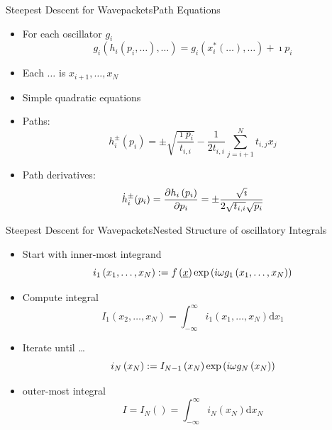 \documentclass{beamer}
\begin{document}
\begin{frame}{Steepest Descent for Wavepackets}{Path Equations}
  \begin{itemize}
    \item For each oscillator $g_i$
    \begin{equation*}
      g_i\left(h_i\left(p_i,\ldots\right), \ldots\right)
      = g_i\left(x_i^{*}(\ldots), \ldots\right) + \imath p_i
    \end{equation*}
    \item Each $\ldots$ is $x_{i+1}, \ldots, x_{N}$
    \item Simple quadratic equations
    \item Paths:
    \begin{equation*}
      h_i^{\pm}(p_i)
      =
      \pm \sqrt{\frac{\imath p_i}{t_{i,i}}}
      -\frac{1}{2 t_{i,i}} \sum_{j=i+1}^{N} t_{i,j} x_j
    \end{equation*}
    \item Path derivatives:
    \begin{equation*}
      \dot{h}_i^{\pm}(p_i) = \frac{\partial h_i\left(p_i\right)}{\partial p_i}
      = \pm \frac{\sqrt{\imath}}{2 \sqrt{t_{i,i}}\sqrt{p_i}}
    \end{equation*}
  \end{itemize}
\end{frame}


\begin{frame}{Steepest Descent for Wavepackets}{Nested Structure of oscillatory Integrals}
  \begin{itemize}
    \item Start with inner-most integrand
    \begin{equation*}
      i_1\left(x_1,\ldots,x_N\right) := f\left(\underline{x}\right) \exp\left(i\omega g_1\left(x_1,\ldots,x_N\right)\right)
    \end{equation*}
    \item Compute integral
    \begin{equation*}
      I_1\left(x_2,\ldots,x_N\right) = \int_{-\infty}^\infty i_1\left(x_1,\ldots,x_N\right) \mathrm{d}x_1
    \end{equation*}
    \item Iterate until \ldots
    \begin{equation*}
      i_N\left(x_N\right) := I_{N-1}\left(x_N\right) \exp\left(i\omega g_N\left(x_N\right)\right)
    \end{equation*}
    \item outer-most integral
    \begin{equation*}
      I = I_N\left(\right) = \int_{-\infty}^\infty i_N\left(x_N\right) \mathrm{d}x_N
    \end{equation*}
  \end{itemize}
\end{frame}
\end{document}
